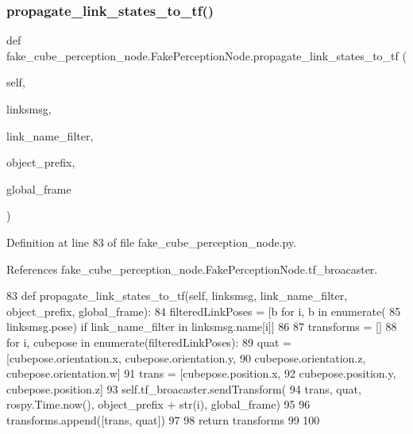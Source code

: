 \subsubsection{\texorpdfstring{propagate\+\_\+link\+\_\+states\+\_\+to\+\_\+tf()}{propagate\_link\_states\_to\_tf()}}
{\footnotesize\ttfamily def fake\+\_\+cube\+\_\+perception\+\_\+node.\+Fake\+Perception\+Node.\+propagate\+\_\+link\+\_\+states\+\_\+to\+\_\+tf (\begin{DoxyParamCaption}\item[{}]{self,  }\item[{}]{linksmsg,  }\item[{}]{link\+\_\+name\+\_\+filter,  }\item[{}]{object\+\_\+prefix,  }\item[{}]{global\+\_\+frame }\end{DoxyParamCaption})}



Definition at line 83 of file fake\+\_\+cube\+\_\+perception\+\_\+node.\+py.



References fake\+\_\+cube\+\_\+perception\+\_\+node.\+Fake\+Perception\+Node.\+tf\+\_\+broacaster.


\begin{DoxyCode}
83     \textcolor{keyword}{def }propagate\_link\_states\_to\_tf(self, linksmsg,  link\_name\_filter, object\_prefix, global\_frame):
84         filteredLinkPoses = [b \textcolor{keywordflow}{for} i, b \textcolor{keywordflow}{in} enumerate(
85             linksmsg.pose) \textcolor{keywordflow}{if} link\_name\_filter \textcolor{keywordflow}{in} linksmsg.name[i]]
86 
87         transforms = []
88         \textcolor{keywordflow}{for} i, cubepose \textcolor{keywordflow}{in} enumerate(filteredLinkPoses):
89             quat = [cubepose.orientation.x, cubepose.orientation.y,
90                     cubepose.orientation.z, cubepose.orientation.w]
91             trans = [cubepose.position.x,
92                      cubepose.position.y, cubepose.position.z]
93             self.tf\_broacaster.sendTransform(
94                 trans, quat, rospy.Time.now(), object\_prefix + str(i), global\_frame)
95 
96             transforms.append([trans, quat])
97 
98         \textcolor{keywordflow}{return} transforms
99 
100 
\end{DoxyCode}
\mbox{\label{classfake__cube__perception__node_1_1FakePerceptionNode_ac1127eae8d2eda994b22873529bd198f}} 
